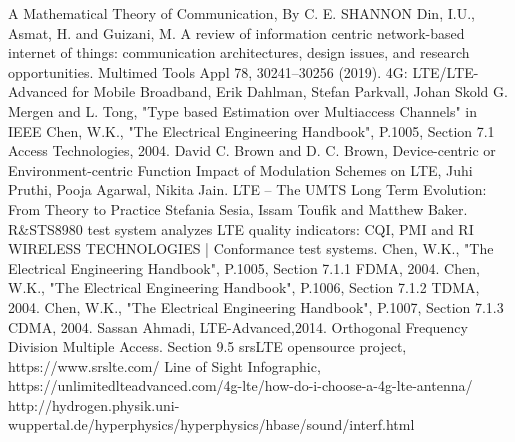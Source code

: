 \begin{thebibliography}{9}
A Mathematical Theory of Communication, By C. E. SHANNON
Din, I.U., Asmat, H. and Guizani, M. A review of information centric network-based internet of things: communication architectures, design issues, and research opportunities. Multimed Tools Appl 78, 30241–30256 (2019). 
4G: LTE/LTE-Advanced for Mobile Broadband, Erik Dahlman, Stefan Parkvall, Johan Skold
G. Mergen and L. Tong, "Type based Estimation over Multiaccess Channels" in IEEE 
Chen, W.K., "The Electrical Engineering Handbook", P.1005, Section 7.1 Access Technologies, 2004.
David C. Brown and D. C. Brown, Device-centric or Environment-centric Function
Impact of Modulation Schemes on LTE, Juhi Pruthi, Pooja Agarwal, Nikita Jain.
LTE – The UMTS Long Term Evolution: From Theory to Practice Stefania Sesia, Issam Toufik and Matthew Baker.
R\&STS8980 test system analyzes LTE quality indicators: CQI, PMI and RI
WIRELESS TECHNOLOGIES | Conformance test systems. 
Chen, W.K., "The Electrical Engineering Handbook", P.1005, Section 7.1.1 FDMA, 2004. 
Chen, W.K., "The Electrical Engineering Handbook", P.1006, Section 7.1.2 TDMA, 2004.
Chen, W.K., "The Electrical Engineering Handbook", P.1007, Section 7.1.3 CDMA, 2004.
Sassan Ahmadi, LTE-Advanced,2014. Orthogonal Frequency Division Multiple Access. Section 9.5
srsLTE opensource project, https://www.srslte.com/ 
Line of Sight Infographic, https://unlimitedlteadvanced.com/4g-lte/how-do-i-choose-a-4g-lte-antenna/
http://hydrogen.physik.uni-wuppertal.de/hyperphysics/hyperphysics/hbase/sound/interf.html
\end{thebibliography}